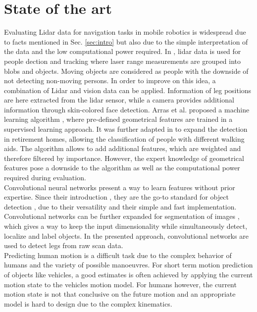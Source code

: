 \section{State of the art}
\label{sec:sota}

Evaluating Lidar data for navigation tasks in mobile robotics is widespread due to facts mentioned in Sec. \ref{sec:intro} but also due to the simple interpretation of the data and the low computational power required.
In \cite{1013691}, lidar data is used for people dection and tracking where laser range measurements are grouped into blobs and objects. 
Moving objects are considered as people with the downside of not detecting non-moving persons.
In order to improve on this idea, a combination of Lidar and vision data \cite{kleinehagenbrock2002person} can be applied. 
Information of leg positions are here extracted from the lidar sensor, while a camera provides additional information through skin-colored face detection. 
Arras et al. proposed a machine learning algorithm \cite{Arras07usingboosted}, where pre-defined geometrical features are trained in a supervised learning approach. 
It was further adapted in \cite{weinrich2014people} to expand the detection in retirement homes, allowing the classification of people with different walking aids. 
The algorithm allows to add additional features, which are weighted and therefore filtered by importance.
However, the expert knowledge of geometrical features pose a downside to the algorithm as well as the computational power required during evaluation.\\
Convolutional neural networks present a way to learn features without prior expertise. 
Since their introduction \cite{lecun_gradient-based_1998}, they are the go-to standard for object detection \cite{krizhevsky_imagenet_2012}, due to their versatility and their simple and fast implementation. 
Convolutional networks can be further expanded for segmentation of images \cite{long2015fully}, which gives a way to keep the input dimensionality while simultaneously detect, localize and label objects.
In the presented approach, convolutional networks are used to detect legs from raw scan data.\\
Predicting human motion is a difficult task due to the complex behavior of humans and the variety of possible manoeuvres.
For short term motion prediction of objects like vehicles, a good estimates is often achieved by applying the current motion state to the vehicles motion model.
For humans however, the current motion state is not that conclusive on the future motion and an appropriate model is hard to design due to the complex kinematics. 
